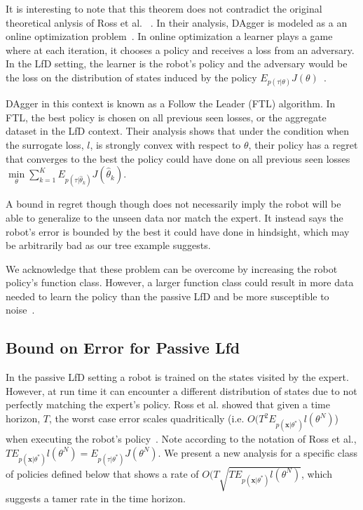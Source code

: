 \documentclass[10pt, conference]{ieeeconf}      %
\newcommand{\bx}{\mathbf{x}}
\begin{document}
It is interesting to note that this theorem does not contradict the original theoretical anlysis of Ross et al. ~\cite{ross2010reduction}. In their analysis, DAgger is modeled as a  an online optimization problem~\cite{ross2010reduction}.  In online optimization a learner plays a game where at each iteration, it chooses a policy and receives a loss from an adversary.  In the LfD setting, the learner is the robot's policy and the adversary would be the loss on the distribution of states induced by the policy $E_{p(\tau|\theta)} J(\theta)$~\cite{shalev2011online}.

DAgger in this context is known as a Follow the Leader (FTL) algorithm. In FTL, the best policy is chosen on all previous seen losses, or the aggregate dataset in the LfD context. Their analysis shows that under the condition when the surrogate loss, $l$, is strongly convex with respect to $\theta$, their policy has a regret that converges to the best the policy could have done on all previous seen losses $\underset{\theta}{\min} \sum_{k=1}^K E_{p(\tau|\hat{\theta}_k)}J(\hat{\theta}_k)$. 

A bound in regret though though does not necessarily imply the robot will be able to generalize to the unseen data nor match the expert. It instead says the robot's error is bounded by the best it could have done in hindsight, which may be arbitrarily bad as our tree example suggests. 

We acknowledge that these  problem can be overcome by increasing the robot policy's function class. However, a larger function class could result in more data needed to learn the policy than the passive LfD and be more susceptible to noise~\cite{kakade2009generalization}.

\subsection{Bound on Error for Passive Lfd}
In the passive LfD setting a robot is trained on the states visited by the expert. However, at run time it can encounter a different distribution of states due to not perfectly matching the expert's policy. Ross et al. showed that given a time horizon, $T$, the worst case error scales quadritically (i.e. $O(T^2E_{p(\bx|\theta^*)} l(\theta^N)$) when executing the robot's policy~\cite{ross2010efficient}. Note according to the notation of Ross et al., $TE_{p(\bx|\theta^*)} l(\theta^N) = E_{p(\tau|\theta^*)} J(\theta^N)$. We present a new analysis for a specific class of policies defined below that shows a rate of $O(T\sqrt{TE_{p(\bx|\theta^*)} l(\theta^N)}$, which suggests a tamer rate in the time horizon. 
\end{document}
